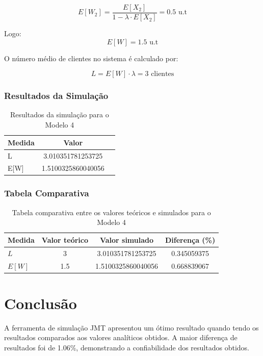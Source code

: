 \documentclass{article}
\begin{document}
\[
{E[W_2]} = \frac{E[X_2]}{1-\lambda\cdot{E[X_2]}} = 0.5 \text{ u.t}
\]

Logo:
\[
{E[W]} = 1.5 \text{ u.t}
\]

O número médio de clientes no sistema é calculado por:

\[
L = {E[W]}\cdot{\lambda} = 3 \text{ clientes}
\]

\subsubsection{Resultados da Simulação}

\begin{table}[H]
    \centering
    \begin{tabular}{|l|c|c|}
        \hline
        \textbf{Medida} & \textbf{Valor}\\
        \hline
        L & 3.010351781253725 \\
        \hline
        E[W] & 1.5100325860040056\\
        \hline

    \end{tabular}
    \caption{Resultados da simulação para o Modelo 4}
    \label{tab:simulacao-modelo4}
\end{table}

\subsubsection{Tabela Comparativa}

\begin{table}[H]
    \centering
    \begin{tabular}{|l|c|c|c|}
        \hline
        \textbf{Medida} & \textbf{Valor teórico} & \textbf{Valor simulado} & \textbf{Diferença (\%)} \\
        \hline
        $L$ & 3 & 3.010351781253725 & 0.345059375 \\ 
        \hline
        $E[W]$ & 1.5 & 1.5100325860040056 & 0.668839067 \\
        \hline
    \end{tabular}
    \caption{Tabela comparativa entre os valores teóricos e simulados para o Modelo 4}
    \label{tab:comparacao-modelo4}
\end{table}

\section{Conclusão}

A ferramenta de simulação JMT apresentou um ótimo resultado quando tendo os resultados comparados aos valores analíticos obtidos. A maior diferença de resultados foi de 1.06\%, demonstrando a confiabilidade dos resultados obtidos. 

% 
\end{document}

